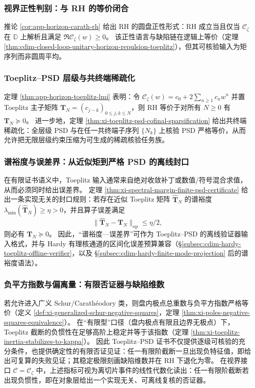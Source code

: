 \subsubsection{视界正性判别：与 RH 的等价闭合}
推论 \ref{cor:app-horizon-carath-rh} 给出 RH 的圆盘正性形式：RH 成立当且仅当 \(\mathscr{C}_{\zeta}\) 在 \(\mathbb{D}\) 上解析且满足 \(\Re \mathscr{C}_{\zeta}(w)\ge 0\)。
该正性语言与缺陷链在逻辑上等价（定理 \ref{thm:cdim-closed-loop-unitary-horizon-repulsion-toeplitz}），但其可核验输入为矩序列而非圆周平均。

\subsubsection{Toeplitz--PSD 层级与共终端稀疏化}
定理 \ref{thm:app-horizon-toeplitz-lmi} 表明：令
\(
\mathscr{C}_{\zeta}(w)=c_0+2\sum_{n\ge 1}c_n w^n
\)
并置 Toeplitz 主子矩阵 \(\mathbf{T}_N=(c_{j-k})_{0\le j,k\le N}\)，则 RH 等价于对所有 \(N\ge 0\) 有 \(\mathbf{T}_N\succeq 0\)。
进一步地，定理 \ref{thm:xi-toeplitz-psd-cofinal-sparsification} 给出共终端稀疏化：全层级 PSD 与在任一共终端子序列 \(\{N_k\}\) 上核验 PSD 严格等价，从而允许把无限层级约束压缩为可生成的稀疏核验任务族。

\subsubsection{谱裕度与误差界：从近似矩到严格 PSD 的离线封口}
在有限证书语义中，Toeplitz 输入通常来自绝对收敛补丁或数值/符号混合求值，从而必须同时给出误差界。
定理 \ref{thm:xi-spectral-margin-finite-psd-certificate} 给出一条实现无关的封口规则：若存在近似 Toeplitz 矩阵 \(\widehat{\mathbf{T}}_N\) 的谱裕度 \(\lambda_{\min}(\widehat{\mathbf{T}}_N)\ge \eta>0\)，并且算子误差满足
\[
\bigl\|\widehat{\mathbf{T}}_N-\mathbf{T}_N\bigr\|_{\mathrm{op}}\le \eta/2,
\]
则必有 \(\mathbf{T}_N\succeq 0\)。
因此，“谱裕度—误差界”可作为 Toeplitz--PSD 的离线验证器输入格式，并与 Hardy 有理核通道的区间化误差预算兼容（\S\ref{subsec:cdim-hardy-toeplitz-offline-verifier}，以及 \S\ref{subsec:cdim-hardy-finite-mode-projection} 后的谱裕度语法）。



\subsubsection{负平方指数与偏离量：有限否证器与缺陷维数}
若允许进入广义 Schur/Carath\'eodory 类，则盘内极点总重数与负平方指数严格等价（定义 \ref{def:xi-generalized-schur-negative-squares}，定理 \ref{thm:xi-poles-negative-squares-equivalence}）。
在“有限型”口径（盘内极点有限且边界无极点）下，Toeplitz 截断的负惯性在足够高阶上稳定并等于该指数（定理 \ref{thm:xi-toeplitz-inertia-stabilizes-to-kappa}）。
因此 Toeplitz--PSD 证书不仅提供逐级可核验的充分条件，也提供确定性的有限否证见证：任一有限阶截断一旦出现负特征值，即给出可复算的失败见证；其稳定极限刻画缺陷维数并在 RH 下退化为零。
在视界接口 \(\mathscr{C}=\mathscr{C}_{\zeta}\) 中，上述指标可视为离切片事件的线性代数化读出：任一有限阶截断若出现负惯性，即在对象层给出一个实现无关、可离线复核的否证器。

